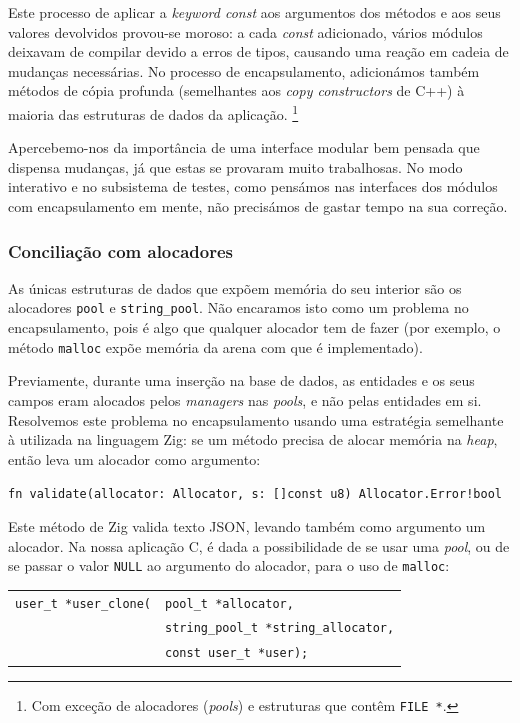 \documentclass[12pt, a4paper]{article}
\begin{document}
Este processo de aplicar a \emph{keyword const} aos argumentos dos métodos e aos seus valores
devolvidos provou-se moroso: a cada \emph{const} adicionado, vários módulos deixavam de compilar
devido a erros de tipos, causando uma reação em cadeia de mudanças necessárias. No processo de
encapsulamento, adicionámos também métodos de cópia profunda (semelhantes aos \emph{copy
constructors} de C++) à maioria das estruturas de dados da aplicação. \footnote{Com exceção de
alocadores (\emph{pools}) e estruturas que contêm \texttt{FILE *}.}

Apercebemo-nos da importância de uma interface modular bem pensada que dispensa mudanças, já que
estas se provaram muito trabalhosas. No modo interativo e no subsistema de testes, como pensámos nas
interfaces dos módulos com encapsulamento em mente, não precisámos de gastar tempo na sua correção.

\subsubsection{Conciliação com alocadores}
\label{sec:allocator-conciliation}

As únicas estruturas de dados que expõem memória do seu interior são os alocadores \texttt{pool} e
\texttt{string\_pool}. Não encaramos isto como um problema no encapsulamento, pois é algo que
qualquer alocador tem de fazer (por exemplo, o método \texttt{malloc} expõe memória da arena com
que é implementado).

Previamente, durante uma inserção na base de dados, as entidades e os seus campos eram alocados
pelos \emph{managers} nas \emph{pools}, e não pelas entidades em si. Resolvemos este problema no
encapsulamento usando uma estratégia semelhante à utilizada na linguagem Zig: se um método precisa
de alocar memória na \emph{heap}, então leva um alocador como argumento:

\begin{center}
    \texttt{fn validate(allocator: Allocator, s: []const u8) Allocator.Error!bool}
\end{center}

Este método de Zig valida texto JSON, levando também como argumento um alocador. Na nossa aplicação
C, é dada a possibilidade de se usar uma \emph{pool}, ou de se passar o valor \texttt{NULL} ao
argumento do alocador, para o uso de \texttt{malloc}:

\begin{center}
    \begin{tabular}{rl}
        \texttt{user\_t *user\_clone(}&\hspace{-3mm}\texttt{pool\_t *allocator,} \\
        &\hspace{-3mm}\texttt{string\_pool\_t *string\_allocator,} \\
        &\hspace{-3mm}\texttt{const user\_t *user);}
    \end{tabular}
\end{center}
\end{document}
